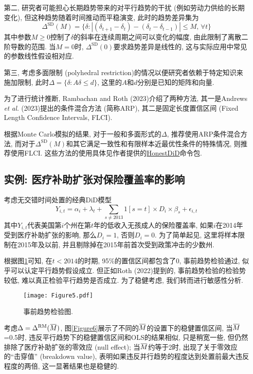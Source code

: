 \documentclass[cn,blue,14pt,screen,bibstyle=gb7714-2015]{elegantnote}
\newcommand{\overbar}[1]{\mkern 1.5mu\overline{\mkern-1.5mu#1\mkern-1.5mu}\mkern 1.5mu}
\begin{document}
第二, 研究者可能担心长期趋势带来的对平行趋势的干扰 (例如劳动力供给的长期变化), 但这种趋势随着时间推动而平稳演变, 此时的趋势差异集为
$$\Delta^\text{SD}(M)=\{\delta:|(\delta_{t+1}-\delta_t)-(\delta_{t}-\delta_{t-1})|\leq M,\,\forall t\}$$
其中参数$M\ge0$控制了$\delta$的斜率在连续周期之间可以变化的幅度, 由此限制了离散二阶导数的范围. 当$M=0$时, $\Delta^\text{SD}(0)$要求趋势差异是线性的, 这与实际应用中常见的参数线性假设相对应.

第三, 考虑多面限制 (polyhedral restriction)的情况以便研究者依赖于特定知识来施加限制, 此时$\Delta=\{\delta:A\delta\leq d\}$, 这里的$A$和$d$分别是已知的矩阵和向量.

为了进行统计推断, Rambachan and Roth (2023)介绍了两种方法, 其一是Andrews \emph{et al.} (2023)提出的条件混合方法 (简称ARP), 其二是固定长度置信区间 (Fixed Length Confidence Intervals, FLCI).

根据Monte Carlo模拟的结果, 对于一般和多面形式的$\Delta$, 推荐使用ARP条件混合方法, 而对于$\Delta^\text{SD}(M)$和其它满足一致性和有限样本近最优性条件的特殊情况, 则推荐使用FLCI. 这些方法的使用具体见作者提供的\href{https://github.com/asheshrambachan/HonestDiD}{HonestDiD}命令包.

\subsection{实例: 医疗补助扩张对保险覆盖率的影响}
考虑无交错时间处置的经典DiD模型
$$Y_{i,t}=\alpha_i+\lambda_t+\sum_{s\neq2013}1[s=t]\times D_i\times \beta_s+\epsilon_{i,t}$$
其中$Y_{i,t}$代表美国第$i$个州在第$t$年的低收入无孩成人的保险覆盖率, 如果$i$在2014年受到医疗补助扩张的影响, 那么$D_i=1$, 否则$D_i=0$. 为了简单起见, 这里将样本限制在2015年及以前, 并且剔除掉在2015年前首次受到政策冲击的少数州.

根据图\ref{Figure5}可知, 在$t<2014$的时期, 95\%的置信区间都包含了0, 事前趋势检验通过, 似乎可以认定平行趋势假设成立. 但正如Roth (2022)提到的, 事前趋势检验的检验势较低, 难以真正检验平行趋势是否成立. 为了稳健考虑, 我们转而进行敏感性分析.
\begin{figure}
  \centering
  \texttt{[image: Figure5.pdf]}
  \caption{事前趋势检验图.}\label{Figure5}
\end{figure}

考虑$\Delta=\Delta^\text{RM}(\overbar{M})$, 图\ref{Figure6}展示了不同的$\overbar{M}$的设置下的稳健置信区间, 当$\overbar{M}$=0.5时, 违反平行趋势下的稳健置信区间和OLS的结果相似, 只是稍宽一些, 但仍然排除了医疗补助扩张的零效应 (null effect); 当$\overbar{M}$约等于2时, 出现了关于零效应的“击穿值” (breakdown value), 表明如果违反并行趋势的程度达到处置前最大违反程度的两倍, 这一显著结果也是稳健的.
\end{document}
